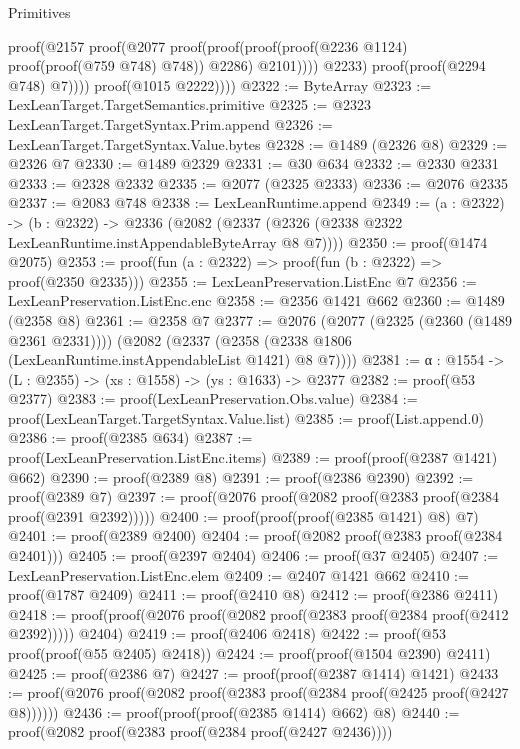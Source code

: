 \begin{lexlean}{Primitives}
\begin{coremodule}
                        proof(@2157
                            proof(@2077
                                proof(proof(proof(proof(@2236 @1124) proof(proof(@759 @748) @748))
                                      @2286)
                                    @2101))))
                      @2233)
                    proof(proof(@2294 @748) @7))))
            proof(@1015 @2222))))
@2322 := ByteArray
@2323 := LexLeanTarget.TargetSemantics.primitive
@2325 := @2323 LexLeanTarget.TargetSyntax.Prim.append
@2326 := LexLeanTarget.TargetSyntax.Value.bytes
@2328 := @1489 (@2326 @8)
@2329 := @2326 @7
@2330 := @1489 @2329
@2331 := @30 @634
@2332 := @2330 @2331
@2333 := @2328 @2332
@2335 := @2077 (@2325 @2333)
@2336 := @2076 @2335
@2337 := @2083 @748
@2338 := LexLeanRuntime.append
@2349 := (a : @2322) ->
  (b : @2322) ->
  @2336 (@2082 (@2337 (@2326 (@2338 @2322 LexLeanRuntime.instAppendableByteArray @8 @7))))
@2350 := proof(@1474 @2075)
@2353 := proof(fun (a : @2322) => proof(fun (b : @2322) => proof(@2350 @2335)))
@2355 := LexLeanPreservation.ListEnc @7
@2356 := LexLeanPreservation.ListEnc.enc
@2358 := @2356 @1421 @662
@2360 := @1489 (@2358 @8)
@2361 := @2358 @7
@2377 := @2076
    (@2077 (@2325 (@2360 (@1489 @2361 @2331))))
    (@2082 (@2337 (@2358 (@2338 @1806 (LexLeanRuntime.instAppendableList @1421) @8 @7))))
@2381 := {α : @1554} -> (L : @2355) -> (xs : @1558) -> (ys : @1633) -> @2377
@2382 := proof(@53 @2377)
@2383 := proof(LexLeanPreservation.Obs.value)
@2384 := proof(LexLeanTarget.TargetSyntax.Value.list)
@2385 := proof(List.append.{0})
@2386 := proof(@2385 @634)
@2387 := proof(LexLeanPreservation.ListEnc.items)
@2389 := proof(proof(@2387 @1421) @662)
@2390 := proof(@2389 @8)
@2391 := proof(@2386 @2390)
@2392 := proof(@2389 @7)
@2397 := proof(@2076 proof(@2082 proof(@2383 proof(@2384 proof(@2391 @2392)))))
@2400 := proof(proof(proof(@2385 @1421) @8) @7)
@2401 := proof(@2389 @2400)
@2404 := proof(@2082 proof(@2383 proof(@2384 @2401)))
@2405 := proof(@2397 @2404)
@2406 := proof(@37 @2405)
@2407 := LexLeanPreservation.ListEnc.elem
@2409 := @2407 @1421 @662
@2410 := proof(@1787 @2409)
@2411 := proof(@2410 @8)
@2412 := proof(@2386 @2411)
@2418 := proof(proof(@2076 proof(@2082 proof(@2383 proof(@2384 proof(@2412 @2392))))) @2404)
@2419 := proof(@2406 @2418)
@2422 := proof(@53 proof(proof(@55 @2405) @2418))
@2424 := proof(proof(@1504 @2390) @2411)
@2425 := proof(@2386 @7)
@2427 := proof(proof(@2387 @1414) @1421)
@2433 := proof(@2076 proof(@2082 proof(@2383 proof(@2384 proof(@2425 proof(@2427 @8))))))
@2436 := proof(proof(proof(@2385 @1414) @662) @8)
@2440 := proof(@2082 proof(@2383 proof(@2384 proof(@2427 @2436))))

\end{coremodule}
\end{lexlean}
